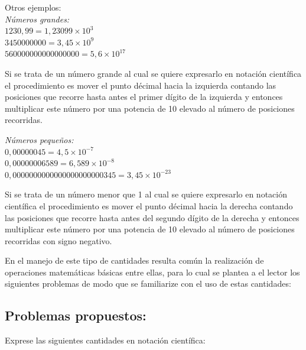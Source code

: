 Otros ejemplos:\\

\textit{Números grandes:}\\

$1230,99 = 1,23099\times10^3$\\
$3450000000 = 3,45\times10^{9}$\\
$560000000000000000 = 5,6\times10^{17}$ 

\begin{tcolorbox}
Si se trata de un número grande al cual se quiere expresarlo en notación científica el procedimiento es mover el punto décimal 
hacia la izquierda contando las posiciones que recorre hasta antes el primer dígito de la izquierda y entonces multiplicar este 
número por una potencia de 10 elevado al 
número de posiciones recorridas. 
\end{tcolorbox}

\textit{Números pequeños:}\\

$0,00000045 = 4,5\times10^{-7}$\\
$0,00000006589 = 6,589\times10^{-8}$\\
$0,0000000000000000000000345 = 3,45\times10^{-23}$\\

\begin{tcolorbox}
Si se trata de un número menor que 1 al cual se quiere expresarlo en notación científica el procedimiento es mover el punto 
décimal hacia la derecha contando las posiciones que recorre hasta antes del segundo dígito de la derecha y entonces multiplicar 
este número por una potencia de 10 elevado al número de posiciones recorridas con signo negativo. 
\end{tcolorbox}

En el manejo de este tipo de cantidades resulta común la realización de operaciones matemáticas básicas entre ellas, para lo cual 
se plantea a el lector los siguientes problemas de modo que se familiarize con el uso de estas cantidades:

\subsection{Problemas propuestos:}

Exprese las siguientes cantidades en notación científica:

